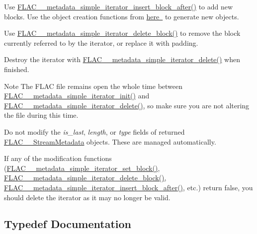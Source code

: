 \begin{DoxyItemize}
\item Use \mbox{\hyperlink{group__flac__metadata__level1_ga1239ccc5ae1dc3f7cb0e1a61707fafc6}{F\+L\+A\+C\+\_\+\+\_\+metadata\+\_\+simple\+\_\+iterator\+\_\+insert\+\_\+block\+\_\+after()}} to add new blocks. Use the object creation functions from \mbox{\hyperlink{group__flac__metadata__object}{here }} to generate new objects.
\item Use \mbox{\hyperlink{group__flac__metadata__level1_gaf0a1823f95f8097f0d2ff3f67ae30a88}{F\+L\+A\+C\+\_\+\+\_\+metadata\+\_\+simple\+\_\+iterator\+\_\+delete\+\_\+block()}} to remove the block currently referred to by the iterator, or replace it with padding.
\item Destroy the iterator with \mbox{\hyperlink{group__flac__metadata__level1_ga46e64734300a022bb9616b26228b0348}{F\+L\+A\+C\+\_\+\+\_\+metadata\+\_\+simple\+\_\+iterator\+\_\+delete()}} when finished.
\end{DoxyItemize}

\begin{DoxyNote}{Note}
The F\+L\+AC file remains open the whole time between \mbox{\hyperlink{group__flac__metadata__level1_ga2a055cca4e6e06ae62517c8b0fa6e8a3}{F\+L\+A\+C\+\_\+\+\_\+metadata\+\_\+simple\+\_\+iterator\+\_\+init()}} and \mbox{\hyperlink{group__flac__metadata__level1_ga46e64734300a022bb9616b26228b0348}{F\+L\+A\+C\+\_\+\+\_\+metadata\+\_\+simple\+\_\+iterator\+\_\+delete()}}, so make sure you are not altering the file during this time.

Do not modify the {\itshape is\+\_\+last}, {\itshape length}, or {\itshape type} fields of returned \mbox{\hyperlink{struct_f_l_a_c_____stream_metadata}{F\+L\+A\+C\+\_\+\+\_\+\+Stream\+Metadata}} objects. These are managed automatically.

If any of the modification functions (\mbox{\hyperlink{group__flac__metadata__level1_ga7d1ceb2db292c968ae6ac18ecb15c356}{F\+L\+A\+C\+\_\+\+\_\+metadata\+\_\+simple\+\_\+iterator\+\_\+set\+\_\+block()}}, \mbox{\hyperlink{group__flac__metadata__level1_gaf0a1823f95f8097f0d2ff3f67ae30a88}{F\+L\+A\+C\+\_\+\+\_\+metadata\+\_\+simple\+\_\+iterator\+\_\+delete\+\_\+block()}}, \mbox{\hyperlink{group__flac__metadata__level1_ga1239ccc5ae1dc3f7cb0e1a61707fafc6}{F\+L\+A\+C\+\_\+\+\_\+metadata\+\_\+simple\+\_\+iterator\+\_\+insert\+\_\+block\+\_\+after()}}, etc.) return {\ttfamily false}, you should delete the iterator as it may no longer be valid. 
\end{DoxyNote}


\subsection{Typedef Documentation}
\mbox{\label{group__flac__metadata__level1_ga6accccddbb867dfc2eece9ee3ffecb3a}} 
